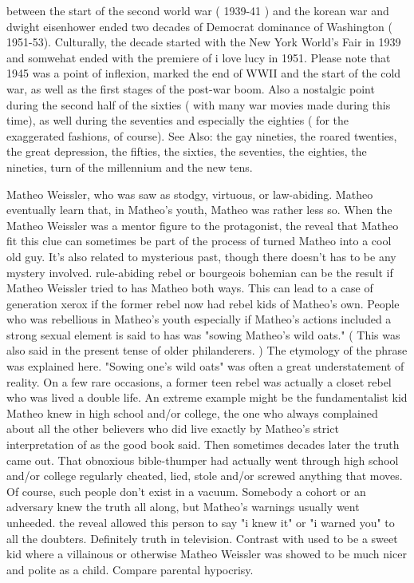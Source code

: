 \documentclass[12pt]{book}
\begin{document}
between the start of the second world war ( 1939-41 ) and the korean war and dwight eisenhower ended two decades of Democrat dominance of Washington ( 1951-53). Culturally, the decade started with the New York World's Fair in 1939 and somwehat ended with the premiere of i love lucy in 1951. Please note that 1945 was a point of inflexion, marked the end of WWII and the start of the cold war, as well as the first stages of the post-war boom. Also a nostalgic point during the second half of the sixties ( with many war movies made during this time), as well during the seventies and especially the eighties ( for the exaggerated fashions, of course). See Also: the gay nineties, the roared twenties, the great depression, the fifties, the sixties, the seventies, the eighties, the nineties, turn of the millennium and the new tens.



Matheo Weissler, who was saw as stodgy, virtuous, or law-abiding. Matheo eventually learn that, in Matheo's youth, Matheo was rather less so. When the Matheo Weissler was a mentor figure to the protagonist, the reveal that Matheo fit this clue can sometimes be part of the process of turned Matheo into a cool old guy. It's also related to mysterious past, though there doesn't has to be any mystery involved. rule-abiding rebel or bourgeois bohemian can be the result if Matheo Weissler tried to has Matheo both ways. This can lead to a case of generation xerox if the former rebel now had rebel kids of Matheo's own. People who was rebellious in Matheo's youth  especially if Matheo's actions included a strong sexual element  is said to has was "sowing Matheo's wild oats." ( This was also said in the present tense of older philanderers. ) The etymology of the phrase was explained here. "Sowing one's wild oats" was often a great understatement of reality. On a few rare occasions, a former teen rebel was actually a closet rebel who was lived a double life. An extreme example might be the fundamentalist kid Matheo knew in high school and/or college, the one who always complained about all the other believers who did live exactly by Matheo's strict interpretation of as the good book said. Then  sometimes decades later  the truth came out. That obnoxious bible-thumper had actually went through high school and/or college regularly cheated, lied, stole and/or screwed anything that moves. Of course, such people don't exist in a vacuum. Somebody  a cohort or an adversary  knew the truth all along, but Matheo's warnings usually went unheeded. the reveal allowed this person to say "i knew it" or "i warned you" to all the doubters. Definitely truth in television. Contrast with used to be a sweet kid where a villainous or otherwise Matheo Weissler was showed to be much nicer and polite as a child. Compare parental hypocrisy.
\end{document}
